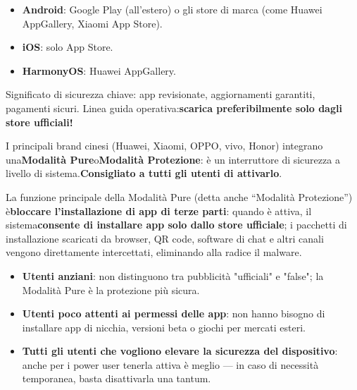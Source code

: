 


\begin{itemize}
  \item \textbf{Android}: Google Play (all'estero) o gli store di marca (come Huawei AppGallery, Xiaomi App Store).
  \item \textbf{iOS}: solo App Store.
  \item \textbf{HarmonyOS}: Huawei AppGallery.
\end{itemize}

Significato di sicurezza chiave: app revisionate, aggiornamenti garantiti, pagamenti sicuri. Linea guida operativa:\textbf{scarica preferibilmente solo dagli store ufficiali!}


I principali brand cinesi (Huawei, Xiaomi, OPPO, vivo, Honor) integrano una\textbf{Modalità Pure}o\textbf{Modalità Protezione}: è un interruttore di sicurezza a livello di sistema.\textbf{Consigliato a tutti gli utenti di attivarlo}.


La funzione principale della Modalità Pure (detta anche “Modalità Protezione”) è\textbf{bloccare l'installazione di app di terze parti}: quando è attiva, il sistema\textbf{consente di installare app solo dallo store ufficiale}; i pacchetti di installazione scaricati da browser, QR code, software di chat e altri canali vengono direttamente intercettati, eliminando alla radice il malware.


\begin{itemize}
  \item \textbf{Utenti anziani}: non distinguono tra pubblicità "ufficiali" e "false"; la Modalità Pure è la protezione più sicura.
  \item \textbf{Utenti poco attenti ai permessi delle app}: non hanno bisogno di installare app di nicchia, versioni beta o giochi per mercati esteri.
  \item \textbf{Tutti gli utenti che vogliono elevare la sicurezza del dispositivo}: anche per i power user tenerla attiva è meglio — in caso di necessità temporanea, basta disattivarla una tantum.
\end{itemize}

